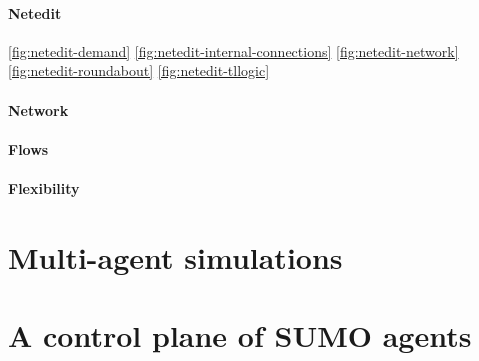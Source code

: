 \paragraph{Netedit}

\ref{fig:netedit-demand}
\ref{fig:netedit-internal-connections}
\ref{fig:netedit-network}
\ref{fig:netedit-roundabout}
\ref{fig:netedit-tllogic}

\paragraph{Network}


\paragraph{Flows}


\paragraph{Flexibility}


\section{Multi-agent simulations}


\section{A control plane of SUMO agents}


